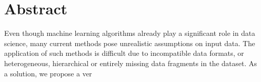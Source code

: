 \vspace*{\fill}
\section*{Abstract}
Even though machine learning algorithms already play a significant role in data science, many current
methods pose unrealistic assumptions on input data. The application of such methods is difficult due
to incompatible data formats, or heterogeneous, hierarchical or entirely missing data fragments in the
dataset. As a solution, we propose a ver
\vspace*{\fill}